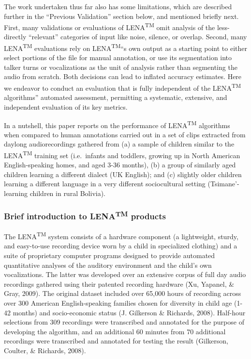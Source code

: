\documentclass[english,floatsintext,man]{apa6}
\begin{document}
The work undertaken thus far also has some limitations, which are
described further in the \enquote{Previous Validation} section below,
and mentioned briefly next. First, many validations or evaluations of
LENA\textsuperscript{TM} omit analysis of the less-directly
\enquote{relevant} categories of input like noise, silence, or overlap.
Second, many LENA\textsuperscript{TM} evaluations rely on
LENA\textsuperscript{TM}\enquote{s own output as a starting point to
either select portions of the file for manual annotation, or use its
segmentation into talker turns or vocalizations as the unit of analysis
rather than segmenting the audio from scratch. Both decisions can lead
to inflated accuracy estimates. Here we endeavor to conduct an
evaluation that is fully independent of the LENA\textsuperscript{TM}
algorithms} automated assessment, permitting a systematic, extensive,
and independent evaluation of its key metrics.

In a nutshell, this paper reports on the performance of
LENA\textsuperscript{TM} algorithms when compared to human annotations
carried out in a set of clips extracted from daylong audiorecordings
gathered from (a) a sample of children similar to the
LENA\textsuperscript{TM} training set (i.e.~infants and toddlers,
growing up in North American English-speaking homes, and aged 3-36
months), (b) a group of similarly aged children learning a different
dialect (UK English); and (c) slightly older children learning a
different language in a very different sociocultural setting
(Tsimane'-learning children in rural Bolivia).

\subsubsection{\texorpdfstring{Brief introduction to
LENA\textsuperscript{TM}
products}{Brief introduction to LENATM products}}\label{brief-introduction-to-lenatm-products}

The LENA\textsuperscript{TM} system consists of a hardware component (a
lightweight, sturdy, and easy-to-use recording device worn by a child in
specialized clothing) and a suite of proprietary computer programs
designed to provide automated quantitative analyses of the auditory
environment and the child's own vocalizations. The latter was developed
over an extensive corpus of full day audio recordings gathered using
their patented recording hardware (Xu, Yapanel, \& Gray, 2009). The
original dataset included over 65,000 hours of recording across over 300
American English-speaking families chosen for diversity in child age
(1-42 months) and socio-economic status (J. Gilkerson \& Richards,
2008). Half-hour selections from 309 recordings were transcribed and
annotated for the purpose of developing the algorithm, and an additional
60 minutes from 70 additional recordings were transcribed and annotated
for testing the result (Gilkerson, Coulter, \& Richards, 2008).
\end{document}
